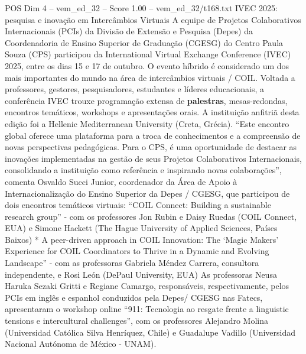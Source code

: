 \begin{textsample}{POS Dim 4 – vem\_ed\_32 – Score 1.00 – vem\_ed\_32/t168.txt}  \label{ex:f4_pos_035}
IVEC 2025: pesquisa e inovação em Intercâmbios Virtuais A equipe de Projetos Colaborativos Internacionais (PCIs) da Divisão de Extensão e Pesquisa (Depes) da Coordenadoria de Ensino Superior de Graduação (CGESG) do Centro Paula Souza (CPS) participou da International Virtual Exchange Conference (IVEC) 2025, entre os dias 15 e 17 de outubro.
O evento híbrido é considerado um dos mais importantes do mundo na área de intercâmbios virtuais / COIL.
Voltada a professores, gestores, pesquisadores, estudantes e líderes educacionais, a conferência IVEC trouxe programação extensa de \textbf{palestras}, mesas-redondas, encontros temáticos, workshops e apresentações orais.
A instituição anfitriã desta edição foi a Hellenic Mediterranean University (Creta, Grécia). “Este encontro global oferece uma plataforma para a troca de conhecimentos e a compreensão de novas perspectivas pedagógicas.
Para o CPS, é uma oportunidade de destacar as inovações implementadas na gestão de seus Projetos Colaborativos Internacionais, consolidando a instituição como referência e inspirando novas colaborações”, comenta Osvaldo Succi Junior, coordenador da Área de Apoio à Internacionalização do Ensino Superior da Depes / CGESG, que participou de dois encontros temáticos virtuais: “COIL Connect: Building a sustainable research group” - com os professores Jon Rubin e Daisy Ruedas (COIL Connect, EUA) e Simone Hackett (The Hague University of Applied Sciences, Países Baixos) * A peer-driven approach in COIL Innovation: The ‘Magic Makers’ Experience for COIL Coordinators to Thrive in a Dynamic and Evolving Landscape” - com as professoras Gabriela Méndez Carrera, consultora independente, e Rosi León (DePaul University, EUA) As professoras Neusa Haruka Sezaki Gritti e Regiane Camargo, responsáveis, respectivamente, pelos PCIs em inglês e espanhol conduzidos pela Depes/ CGESG nas Fatecs, apresentaram o workshop online “911: Tecnologia ao resgate frente a linguistic tensions e intercultural challenges”, com os professores Alejandro Molina (Universidad Católica Silva Henríquez, Chile) e Guadalupe Vadillo (Universidad Nacional Autónoma de México - UNAM).

\end{textsample}
